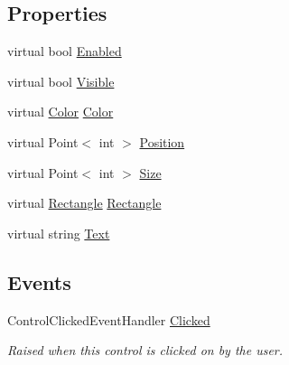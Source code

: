 \subsection*{Properties}
\begin{DoxyCompactItemize}
\item 
virtual bool \hyperlink{class_tri_devs_1_1_tri_engine2_d_1_1_u_i_1_1_control_a662c990a4fec19ac7c6c1a1a01648c77}{Enabled}
\item 
virtual bool \hyperlink{class_tri_devs_1_1_tri_engine2_d_1_1_u_i_1_1_control_acecae44ceb3fa79d765f8f49b29fbaa8}{Visible}
\item 
virtual \hyperlink{struct_tri_devs_1_1_tri_engine2_d_1_1_color}{Color} \hyperlink{class_tri_devs_1_1_tri_engine2_d_1_1_u_i_1_1_control_a0fd69d349a7ef225ac6273c0a206356a}{Color}
\item 
virtual Point$<$ int $>$ \hyperlink{class_tri_devs_1_1_tri_engine2_d_1_1_u_i_1_1_control_af0c36c7173572c359c6e3b7a79346c65}{Position}
\item 
virtual Point$<$ int $>$ \hyperlink{class_tri_devs_1_1_tri_engine2_d_1_1_u_i_1_1_control_a9f162a69e4a170ed284cf13b0eaa655f}{Size}
\item 
virtual \hyperlink{struct_tri_devs_1_1_tri_engine2_d_1_1_rectangle}{Rectangle} \hyperlink{class_tri_devs_1_1_tri_engine2_d_1_1_u_i_1_1_control_abcbba8d52dd84084bf239f2aea001bf7}{Rectangle}
\item 
virtual string \hyperlink{class_tri_devs_1_1_tri_engine2_d_1_1_u_i_1_1_control_aa7bf638cc2b14351c9b09c5a7fdefce9}{Text}
\end{DoxyCompactItemize}
\subsection*{Events}
\begin{DoxyCompactItemize}
\item 
Control\-Clicked\-Event\-Handler \hyperlink{class_tri_devs_1_1_tri_engine2_d_1_1_u_i_1_1_control_aa1540c7b2b3439e037b4e6c0247086fc}{Clicked}
\begin{DoxyCompactList}\small\item\em Raised when this control is clicked on by the user. \end{DoxyCompactList}\end{DoxyCompactItemize}


